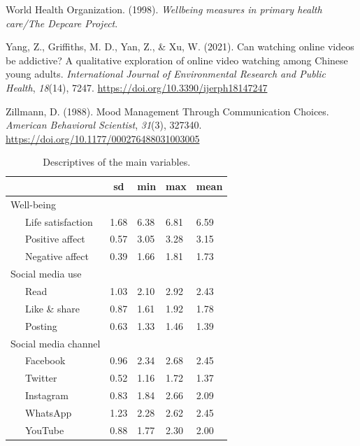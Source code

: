 \documentclass[
  man,mask]{apa6}
\newlength{\cslhangindent}
\newlength{\cslentryspacingunit} %
\newenvironment{CSLReferences}[2] %
 {%
  \setlength{\parindent}{0pt}
  \ifodd #1
  \let\oldpar\par
  \def\par{\hangindent=\cslhangindent\oldpar}
  \fi
  \setlength{\parskip}{#2\cslentryspacingunit}
 }%
 {}
\begin{document}
\begin{CSLReferences}{1}{0}
\leavevmode{}%
World Health Organization. (1998). \emph{Wellbeing measures in primary health care/{The Depcare Project}}.

\leavevmode{}%
Yang, Z., Griffiths, M. D., Yan, Z., \& Xu, W. (2021). Can watching online videos be addictive? {A} qualitative exploration of online video watching among {Chinese} young adults. \emph{International Journal of Environmental Research and Public Health}, \emph{18}(14), 7247. \url{https://doi.org/10.3390/ijerph18147247}

\leavevmode{}%
Zillmann, D. (1988). Mood {Management Through Communication Choices}. \emph{American Behavioral Scientist}, \emph{31}(3), 327340. \url{https://doi.org/10.1177/000276488031003005}

\end{CSLReferences}

\newpage

\begin{table}[tbp]

\begin{center}
\begin{threeparttable}

\caption{\label{tab:tab-descriptives}Descriptives of the main variables.}

\begin{tabular}{lllll}
\toprule
 & \multicolumn{1}{c}{sd} & \multicolumn{1}{c}{min} & \multicolumn{1}{c}{max} & \multicolumn{1}{c}{mean}\\
\midrule
Well-being &  &  &  & \\
\ \ \ Life satisfaction & 1.68 & 6.38 & 6.81 & 6.59\\
\ \ \ Positive affect & 0.57 & 3.05 & 3.28 & 3.15\\
\ \ \ Negative affect & 0.39 & 1.66 & 1.81 & 1.73\\
Social media use &  &  &  & \\
\ \ \ Read & 1.03 & 2.10 & 2.92 & 2.43\\
\ \ \ Like \& share & 0.87 & 1.61 & 1.92 & 1.78\\
\ \ \ Posting & 0.63 & 1.33 & 1.46 & 1.39\\
Social media channel &  &  &  & \\
\ \ \ Facebook & 0.96 & 2.34 & 2.68 & 2.45\\
\ \ \ Twitter & 0.52 & 1.16 & 1.72 & 1.37\\
\ \ \ Instagram & 0.83 & 1.84 & 2.66 & 2.09\\
\ \ \ WhatsApp & 1.23 & 2.28 & 2.62 & 2.45\\
\ \ \ YouTube & 0.88 & 1.77 & 2.30 & 2.00\\
\bottomrule
\end{tabular}

\end{threeparttable}
\end{center}

\end{table}
\end{document}
